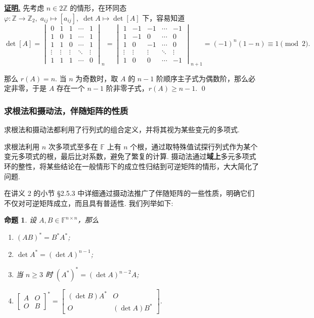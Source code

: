 \documentclass[10pt,openany]{article}
\theoremstyle{thmstyle} %
\theoremstyle{defstyle} %
\theoremstyle{prostyle} %
\newtheorem{proposition}[theorem]{命题}
\theoremstyle{exastyle}
\theoremstyle{remstyle}
\renewenvironment{proof}[1][证明]{\par\underline{\textbf{#1.}} \;\fangsong}{\qed\par}
\newcommand{\F}{\mathbb{F}}
\newcommand{\n}{^{n \times n}}
\begin{document}
\begin{proof}
	先考虑 \( n \in 2\mathbb{Z} \) 的情形，在环同态 \( \varphi:\mathbb{Z} \to \mathbb{Z}_2, \; a_{ij} \mapsto [a_{ij}], \; \det A \mapsto \det [A] \) 下，容易知道
	\[ \det [A]= \begin{vmatrix}
		0 & 1 & 1 & \cdots & 1 \\
		1 & 0 & 1 & \cdots & 1 \\
	    1 & 1 & 0 & \cdots & 1 \\
		\vdots & \vdots & \vdots & \ddots & \vdots \\
		1 & 1 & 1 & \cdots & 0
	\end{vmatrix}_n= \begin{vmatrix}
	1 & -1 & -1 & \cdots & -1 \\
	1 & -1 & 0 & \cdots & 0 \\
	1 & 0 & -1 & \cdots & 0 \\
	\vdots & \vdots & \vdots & \ddots & \vdots \\
	1 & 0 & 0 & \cdots & -1
	\end{vmatrix}_{n+1}=(-1)^n(1-n) \equiv 1 \pmod{2}. \]
	
	那么 \( r(A)=n \). 当 \( n \) 为奇数时，取 \( A \) 的 \( n-1 \) 阶顺序主子式为偶数阶，那么必定非零，于是 \( A \) 存在一个 \( n-1 \) 阶非零子式，\( r(A) \geq n-1 \).
\end{proof}

\subsubsection{求根法和摄动法，伴随矩阵的性质}

求根法和摄动法都利用了行列式的组合定义，并将其视为某些变元的多项式.

求根法利用 \( n \) 次多项式至多在 \( \F \) 上有 \( n \) 个根，通过取特殊值试探行列式作为某个变元多项式的根，最后比对系数，避免了繁复的计算. 摄动法通过\textbf{域上}多元多项式环的整性，将某些结论在一般情形下的成立性归结到可逆矩阵的情形，大大简化了问题.

在讲义 2 的小节 \S 2.5.3 中详细通过摄动法推广了伴随矩阵的一些性质，明确它们不仅对可逆矩阵成立，而且具有普适性. 我们列举如下:

\begin{proposition} \label{4.1.22}
	设 \( A,B \in \F\n \)，那么
	\begin{enumerate}[(1)]
		\item \( (AB)^*=B^*A^* \);
		\item \( \det A^*= (\det A)^{n-1} \);
		\item 当 \( n \geq 3 \) 时 \( (A^*)^*=(\det A)^{n-2} A \); 
		\item \( \begin{bmatrix}
			A & O \\
			O & B
		\end{bmatrix}^*= \begin{bmatrix}
		(\det B)A^* & O \\
		O & (\det A)B^*
		\end{bmatrix} \).
	\end{enumerate}
\end{proposition}
\end{document}
